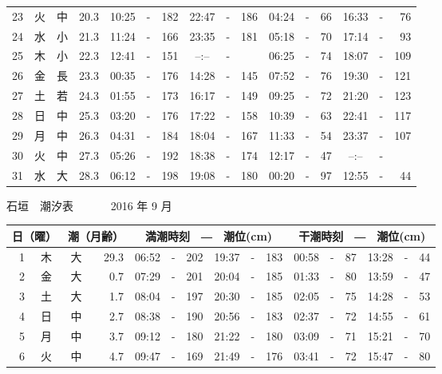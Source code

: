 \documentclass[12pt.a4j]{jsarticle}
\begin{document}
\begin{center}
\begin{table}[ht]
\begin{tabular}{|rc|cr|ccrccr|ccrccr|}
23 & 火 & 中 & 20.3 &  10:25 &-& 182  &  22:47 &-& 186  &   04:24 &-&  66  &   16:33 &-&  76  \\
24 & 水 & 小 & 21.3 &  11:24 &-& 166  &  23:35 &-& 181  &   05:18 &-&  70  &   17:14 &-&  93  \\
25 & 木 & 小 & 22.3 &  12:41 &-& 151  &  --:-- &-&     &   06:25 &-&  74  &   18:07 &-& 109  \\
26 & 金 & 長 & 23.3 &  00:35 &-& 176  &  14:28 &-& 145  &   07:52 &-&  76  &   19:30 &-& 121  \\
27 & 土 & 若 & 24.3 &  01:55 &-& 173  &  16:17 &-& 149  &   09:25 &-&  72  &   21:20 &-& 123  \\
28 & 日 & 中 & 25.3 &  03:20 &-& 176  &  17:22 &-& 158  &   10:39 &-&  63  &   22:41 &-& 117  \\
29 & 月 & 中 & 26.3 &  04:31 &-& 184  &  18:04 &-& 167  &   11:33 &-&  54  &   23:37 &-& 107  \\
30 & 火 & 中 & 27.3 &  05:26 &-& 192  &  18:38 &-& 174  &   12:17 &-&  47  &   --:-- &-&     \\
31 & 水 & 大 & 28.3 &  06:12 &-& 198  &  19:08 &-& 180  &   00:20 &-&  97  &   12:55 &-&  44  \\
   \hline
   \end{tabular}
\end{table}
\newpage
 {\LARGE 石垣　潮汐表　　　}
 {\large 2016 年  9 月}\\
 \begin{table}[ht]
    \begin{tabular}{|rc|cr|ccrccr|ccrccr|}
    \hline
    \multicolumn{2}{|c|}{日（曜）} & \multicolumn{2}{c|}{潮（月齢）} & \multicolumn{6}{c|}{満潮時刻　―　潮位(cm)} & \multicolumn{6}{c|}{干潮時刻　―　潮位(cm)} \\
 \hline
 1 & 木 & 大 & 29.3 &  06:52 &-& 202  &  19:37 &-& 183  &   00:58 &-&  87  &   13:28 &-&  44  \\
 2 & 金 & 大 &  0.7 &  07:29 &-& 201  &  20:04 &-& 185  &   01:33 &-&  80  &   13:59 &-&  47  \\
 3 & 土 & 大 &  1.7 &  08:04 &-& 197  &  20:30 &-& 185  &   02:05 &-&  75  &   14:28 &-&  53  \\
 4 & 日 & 中 &  2.7 &  08:38 &-& 190  &  20:56 &-& 183  &   02:37 &-&  72  &   14:55 &-&  61  \\
 5 & 月 & 中 &  3.7 &  09:12 &-& 180  &  21:22 &-& 180  &   03:09 &-&  71  &   15:21 &-&  70  \\
 6 & 火 & 中 &  4.7 &  09:47 &-& 169  &  21:49 &-& 176  &   03:41 &-&  72  &   15:47 &-&  80  \\

\end{tabular}
\end{table}
\end{center}
\end{document}
